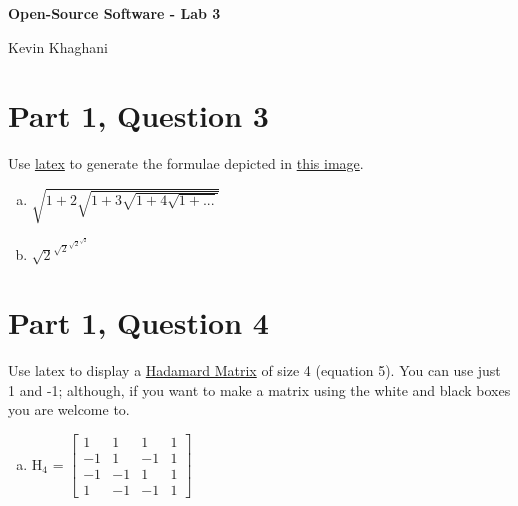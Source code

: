 \documentclass[]{amsart}
\begin{document}
\centerline{\bf \Large Open-Source Software - Lab 3}
\centerline{Kevin Khaghani}
\thispagestyle{empty}


\section*{Part 1, Question 3}

\text Use \href{http://www.artofproblemsolving.com/texer}{latex} to generate the formulae depicted in \href{https://github.com/rcos/CSCI-4961-01-Summer-2018/blob/master/Labs/latex_formulae.png}{this image}.

\medskip
\begin{enumerate}[a.]
	\item $\sqrt{1 + 2\sqrt{1 + 3\sqrt{1 + 4\sqrt{1 + . . .}}}}$
	
	\medskip\item $\sqrt{2}^{\sqrt{2}^{\sqrt{2}^{\sqrt{2}}}}$
\end{enumerate}




\newpage
\thispagestyle{empty}


\section*{Part 1, Question 4}

\text Use latex to display a \href{https://mathworld.wolfram.com/HadamardMatrix.html}{Hadamard Matrix} of size 4 (equation 5). You can use just 1 and -1; although, if you want to make a matrix using the white and black boxes you are welcome to.

\medskip
\begin{enumerate}[a.]

	\item H$_{4}$ =
	$
	\begin{bmatrix}
		1 &  1 &  1 &  1 \\
		-1 &  1 & -1 &  1 \\
		-1 & -1 &  1 &  1 \\
		1 & -1 & -1 &  1
	\end{bmatrix}
	$
\end{enumerate}

\end{document}
